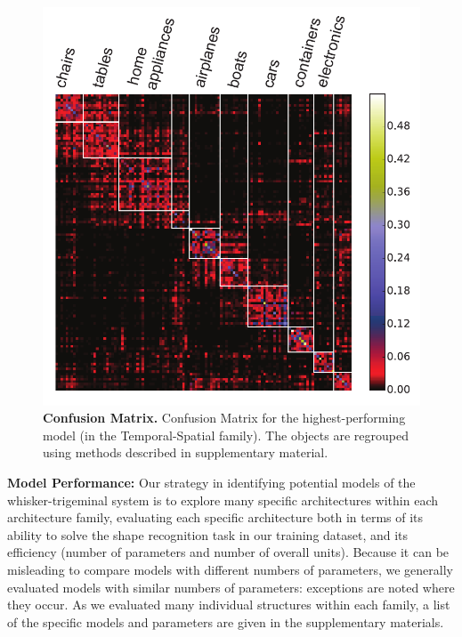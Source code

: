 \begin{figure}
\FigCenter
\includegraphics [width=\SmallFigSize\linewidth]{figures/confusion.pdf}
\vspace{-3mm}
\caption{\footnotesize{\textbf{Confusion Matrix.} Confusion Matrix for the highest-performing model (in the Temporal-Spatial family). The objects are regrouped using methods described in supplementary material.}~\label{fig_confusion}}
\vspace{-5mm}
\end{figure}

\textbf{Model Performance:} 
Our strategy in identifying potential models of the whisker-trigeminal system is to explore many specific architectures within each architecture family, evaluating each specific architecture both in terms of its ability to solve the shape recognition task in our training dataset, and its efficiency (number of parameters and number of overall units).
Because it can be misleading to compare models with different numbers of parameters, we generally evaluated models with similar numbers of parameters: exceptions are noted where they occur.
As we evaluated many individual structures within each family, a list of the specific models and parameters are given in the supplementary materials.

